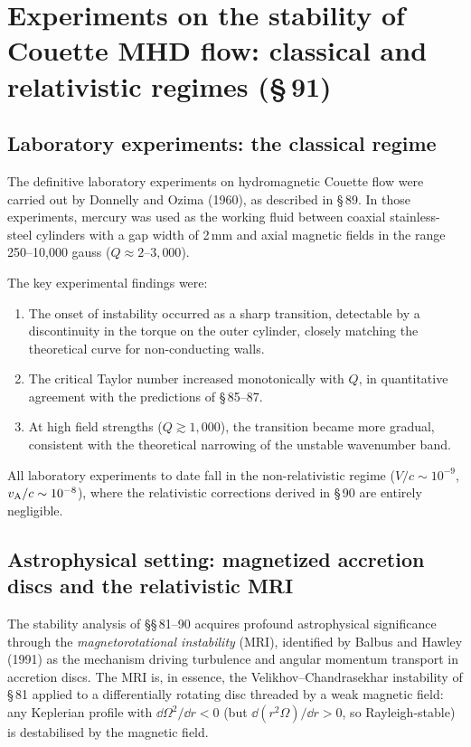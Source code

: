 \section{Experiments on the stability of Couette MHD flow:
classical and relativistic regimes (\S\,91)}
\label{sec:rel-9-91}

\subsection{Laboratory experiments: the classical regime}

The definitive laboratory experiments on hydromagnetic Couette flow
were carried out by Donnelly and Ozima (1960), as described in
\S\,89.  In those experiments, mercury was used as the working fluid
between coaxial stainless-steel cylinders with a gap width of 2\,mm
and axial magnetic fields in the range 250--10,000 gauss
($Q \approx 2$--$3{,}000$).

The key experimental findings were:
\begin{enumerate}
  \item The onset of instability occurred as a sharp transition,
        detectable by a discontinuity in the torque on the outer
        cylinder, closely matching the theoretical curve for
        non-conducting walls.
  \item The critical Taylor number increased monotonically with $Q$,
        in quantitative agreement with the predictions of \S\,85--87.
  \item At high field strengths ($Q \gtrsim 1{,}000$), the transition
        became more gradual, consistent with the theoretical
        narrowing of the unstable wavenumber band.
\end{enumerate}

All laboratory experiments to date fall in the non-relativistic regime
($V/c \sim 10^{-9}$, $v_{\mathrm{A}}/c \sim 10^{-8}$), where the relativistic
corrections derived in \S\,90 are entirely negligible.

\subsection{Astrophysical setting: magnetized accretion discs and the
relativistic MRI}

The stability analysis of \S\S\,81--90 acquires profound astrophysical
significance through the \emph{magnetorotational instability} (MRI),
identified by Balbus and Hawley (1991) as the mechanism driving
turbulence and angular momentum transport in accretion discs.  The
MRI is, in essence, the Velikhov--Chandrasekhar instability of
\S\,81 applied to a differentially rotating disc threaded by a weak
magnetic field: any Keplerian profile with $\dd\Omega^{2}/\dd r < 0$
(but $\dd(r^{2}\Omega)/\dd r > 0$, so Rayleigh-stable) is
destabilised by the magnetic field.

